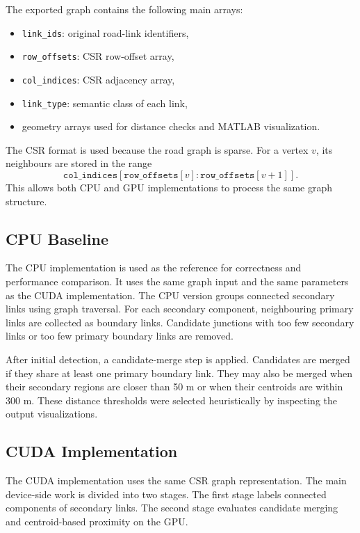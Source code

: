 \documentclass[conference]{IEEEtran}
\begin{document}
The exported graph contains the following main arrays:
\begin{itemize}
    \item \texttt{link\_ids}: original road-link identifiers,
    \item \texttt{row\_offsets}: CSR row-offset array,
    \item \texttt{col\_indices}: CSR adjacency array,
    \item \texttt{link\_type}: semantic class of each link,
    \item geometry arrays used for distance checks and MATLAB visualization.
\end{itemize}

The CSR format is used because the road graph is sparse. For a vertex $v$, its neighbours are stored in the range
\begin{equation}
\texttt{col\_indices}[\texttt{row\_offsets}[v] : \texttt{row\_offsets}[v+1]].
\end{equation}
This allows both CPU and GPU implementations to process the same graph structure.

\subsection{CPU Baseline}

The CPU implementation is used as the reference for correctness and performance comparison. It uses the same graph input and the same parameters as the CUDA implementation. The CPU version groups connected secondary links using graph traversal. For each secondary component, neighbouring primary links are collected as boundary links. Candidate junctions with too few secondary links or too few primary boundary links are removed.

After initial detection, a candidate-merge step is applied. Candidates are merged if they share at least one primary boundary link. They may also be merged when their secondary regions are closer than 50 m or when their centroids are within 300 m. These distance thresholds were selected heuristically by inspecting the output visualizations.

\subsection{CUDA Implementation}

The CUDA implementation uses the same CSR graph representation. The main device-side work is divided into two stages. The first stage labels connected components of secondary links. The second stage evaluates candidate merging and centroid-based proximity on the GPU.
\end{document}
